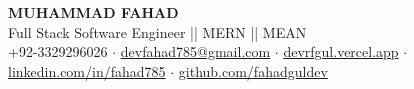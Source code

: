 \documentclass[12pt,a4paper]{article}
\begin{document}

\begin{minipage}[t]{\textwidth}
  {\huge\bfseries\color{darktext} MUHAMMAD FAHAD}\\[2pt]
  {\large\color{accentcyan} Full Stack Software Engineer || MERN || MEAN}\\[2pt]
  {\small\color{medgrey}
    +92-3329296026
    $\cdot$
    \href{mailto:devfahad785@gmail.com}{\color{accentcyan}devfahad785@gmail.com}
    $\cdot$
    \href{https://devrfgul.vercel.app/}{\color{accentcyan}devrfgul.vercel.app}
    $\cdot$
    \href{https://www.linkedin.com/in/fahadguldev}{\color{accentcyan}linkedin.com/in/fahad785}
    $\cdot$
    \href{https://github.com/fahadguldev/}{\color{accentcyan}github.com/fahadguldev}
  }
\end{minipage}

\vspace{6pt}
\noindent{\color{sectionline}\rule{\textwidth}{1.5pt}}
\vspace{4pt}
\end{document}
